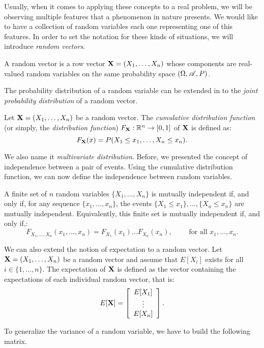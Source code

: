 Usually, when it comes to applying these concepts to a real problem, we will be observing multiple features that a phenomenon in nature presents. We would like to have a collection of random variables each one representing one of this features.
In order to set the notation for these kinds of situations, we will introduce \emph{random vectors}.

\begin{ndef}
  A random vector is a row vector $\mathbf{X} = (X_1,\dots,X_n)$ whose components are real-valued random variables on the same probability space $(\Omega,\mathscr{A},P)$.
\end{ndef}

The probability distribution of a random variable can be extended in to the \emph{joint probability distribution} of a random vector.

\begin{ndef}
Let $\mathbf{X} = (X_1,\dots,X_n)$ be a random vector. The \emph{cumulative distribution function} (or simply, the \emph{distribution function}) $F_{\mathbf{X}} : \mathbb{R}^n \to [0,1]$ of $\mathbf{X}$ is defined as:
$$
F_{\mathbf{X}}(x) = P(X_1 \leq x_1 , \dots, X_n \leq x_n).
$$
\end{ndef}

We also name it \emph{multivariate distribution}. Before, we presented the concept of independence between a pair of events. Using the cumulative distribution function, we can now define the independence between random variables.
\begin{ndef}
A finite set of $n$ random variables $\{X_1,\dots,X_n\}$ is mutually independent if, and only if, for any sequence $\{x_1,\dots,x_n\}$, the events $\{X_1 \leq x_1\}, \dots, \{X_n \leq x_n\}$ are mutually independent. 
Equivalently, this finite set is mutually independent if, and only if,:
$$
F_{X_1,\dots, X_n}(x_1,\dots,x_n) = F_{X_1}(x_1) \dots F_{X_n}(x_n), \quad \quad \text{ for all } x_1,\dots,x_n.
$$
\end{ndef}


We can also extend the notion of expectation to a random vector. Let $\mathbf{X} = (X_1,\dots,X_n)$ be a random vector and assume that $E[X_i]$ exists for all $i \in \{1, \dots, n \}$. The expectation of $\mathbf{X}$ is defined as the vector containing the expectations of each individual random vector, that is:
$$
E[\mathbf{X}] = \left[ \begin{array}{c} 
E[X_1]\\
\vdots\\
E[X_n]
\end{array} \right].
$$

To generalize the variance of a random variable, we have to build the following matrix.

